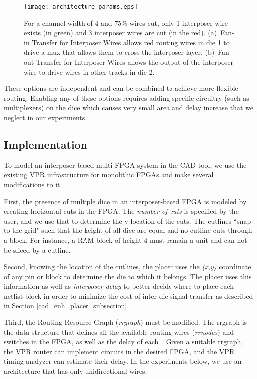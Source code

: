 \documentclass[journal]{IEEEtran}
\begin{document}
\begin{figure}[!htbp]
\centering
\texttt{[image: architecture\_params.eps]}
\caption{For a channel width of 4 and 75\% wires cut, only 1 interposer wire exists (in green) and 3 interposer wires are cut (in the red). (a)~Fan-in Transfer for Interposer Wires allows red routing wires in die 1  to drive a mux that allows them to cross the interposer layer. (b)~Fan-out Transfer for Interposer Wires allows the output of the interposer wire to drive wires in other tracks in die 2.}
\label{fig:architecture_params}
\end{figure}

These options are independent and can be combined to achieve more flexible routing. Enabling any of these options requires adding specific circuitry (such as multiplexers) on the dice which causes very small area and delay increase that we neglect in our experiments.

\subsection{Implementation}
To model an interposer-based multi-FPGA system in the CAD tool, we use the existing VPR infrastructure for monolithic FPGAs and make several modifications to it.

First, the presence of multiple dice in an interposer-based FPGA is modeled by creating horizontal cuts in the FPGA. The \textit{number of cuts} is specified by the user, and we use that to determine the y-location of the cuts. The cutlines ``snap to the grid" such that the height of all dice are equal and no cutline cuts through a block. For instance, a RAM block of height 4 must remain a unit and can not be sliced by a cutline.

Second, knowing the location of the cutlines, the placer uses the \textit{(x,y)} coordinate of any pin or block to determine the die to which it belongs. The placer uses this information as well as \textit{interposer delay} to better decide where to place each netlist block in order to minimize the cost of inter-die signal transfer as described in Section \ref{cad_enh_placer_subsection}.

Third, the Routing Resource Graph (\textit{rrgraph}) must be modified. The rrgraph is the data structure that defines all the available routing wires (\textit{rrnodes}) and switches in the FPGA, as well as the delay of each~\cite{betz1999architecture}. Given a suitable rrgraph, the VPR router can implement circuits in the desired FPGA, and the VPR timing analyzer can estimate their delay. In the experiments below, we use an architecture that has only unidirectional wires.
\end{document}
